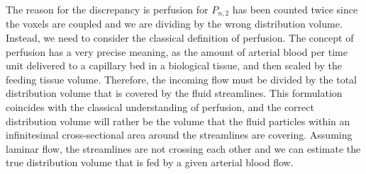 \documentclass[paper=a4, fontsize=11pt,parskip=half,headings=small]{scrartcl}
\begin{document}
	The reason for the discrepancy is perfusion for $P_{n,2}$ has been counted twice since the voxels are coupled and we are dividing by the wrong distribution volume. 
	Instead, we need to consider the classical definition of perfusion. 
	The concept of perfusion has a very precise meaning, as the amount of arterial blood per time unit delivered to a capillary bed in a biological tissue, and then scaled by the feeding tissue volume. 
	Therefore, the incoming flow must be divided by the total distribution volume that is covered by the fluid streamlines. 
	This formulation coincides with the classical understanding of perfusion, and the correct distribution volume will rather be the volume that the fluid particles within an infinitesimal cross-sectional area around the streamlines are covering. 
	Assuming laminar flow, the streamlines are not crossing each other and we can estimate the true distribution volume that is fed by a given arterial blood flow.
\end{document}
